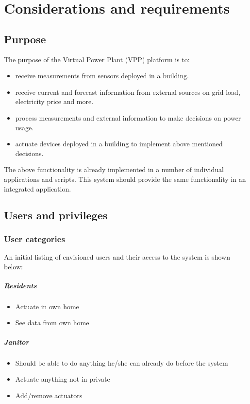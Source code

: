 \chapter{Considerations and requirements}

\section{Purpose}

The purpose of the Virtual Power Plant (VPP) platform is to:
\begin{itemize}
	\item receive measurements from sensors deployed in a building.
	\item receive current and forecast information from external sources on grid load, electricity price and more.
	\item process measurements and external information to make decisions on power usage.
	\item actuate devices deployed in a building to implement above mentioned decisions.
\end{itemize} 
The above functionality is already implemented in a number of individual applications and scripts. This system should provide the same functionality in an integrated application.

\newpage
\section{Users and privileges}

\subsection{User categories}
An initial listing of envisioned users and their access to the system is shown below:

\paragraph{Residents}
\begin{itemize}
    \item{Actuate in own home}
    \item{See data from own home}
\end{itemize}

\paragraph{Janitor}
\begin{itemize}
    \item{Should be able to do anything he/she can already do before the system}
    \item{Actuate anything not in private}
    \item{Add/remove actuators}
\end{itemize}

